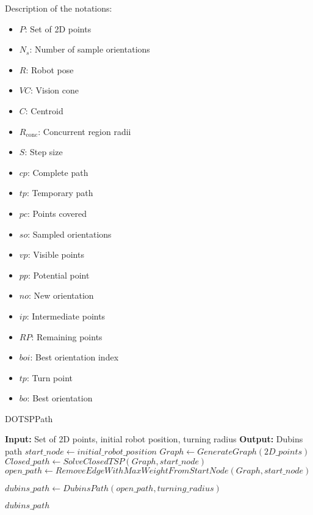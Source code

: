     Description of the notations:
    \begin{itemize}[noitemsep,topsep=0pt]
        \item $P$: Set of 2D points
        \item $N_s$: Number of sample orientations
        \item $R$: Robot pose
        \item $VC$: Vision cone
        \item $C$: Centroid
        \item $R_{\text{conc}}$: Concurrent region radii
        \item $S$: Step size
        \item $cp$: Complete path
        \item $tp$: Temporary path
        \item $pc$: Points covered
        \item $so$: Sampled orientations
        \item $vp$: Visible points
        \item $pp$: Potential point
        \item $no$: New orientation
        \item $ip$: Intermediate points
        \item $RP$: Remaining points
        \item $boi$: Best orientation index
        \item $tp$: Turn point
        \item $bo$: Best orientation
    \end{itemize}
    



\begin{algorithm}[H]
    \caption{DOTSPPath}
    \begin{algorithmic}[1]
        \Statex \textbf{Input:} Set of 2D points, initial robot position, turning radius
        \Statex \textbf{Output:} Dubins path
        \newline
        \State $start\_node \gets initial\_robot\_position$
        \State $Graph \gets GenerateGraph(2D\_points)$
        \State $Closed\_path \gets SolveClosedTSP(Graph, start\_node)$
        \State $open\_path \gets RemoveEdgeWithMaxWeightFromStartNode(Graph, start\_node)$
        
        \State $dubins\_path \gets DubinsPath(open\_path, turning\_radius)$
        
        \State \Return $dubins\_path$
    \end{algorithmic}
\end{algorithm}


